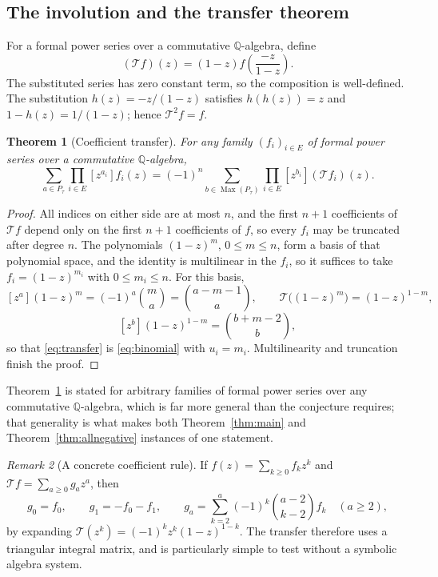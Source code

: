 \documentclass[11pt]{article}
\numberwithin{equation}{section}
\newtheorem{theorem}{Theorem}[section]
\theoremstyle{definition}
\theoremstyle{remark}
\newtheorem{remark}[theorem]{Remark}
\newcommand{\Q}{\mathbb Q}
\newcommand{\Max}{\operatorname{Max}}
\newcommand{\Tr}{\mathcal T}
\begin{document}
\subsection{The involution and the transfer theorem}

For a formal power series over a commutative $\Q$-algebra, define
\begin{equation}
 (\Tr f)(z)=(1-z)f\left(\frac{-z}{1-z}\right).
 \label{eq:T}
\end{equation}
The substituted series has zero constant term, so the composition is
well-defined. The substitution $h(z)=-z/(1-z)$ satisfies $h(h(z))=z$ and
$1-h(z)=1/(1-z)$; hence $\Tr^2f=f$.

\begin{theorem}[Coefficient transfer]
\label{thm:transfer}
For any family $(f_i)_{i\in E}$ of formal power series over a commutative
$\Q$-algebra,
\begin{equation}
 \boxed{\displaystyle
 \sum_{a\in P_\tau}\prod_{i\in E}[z^{a_i}]f_i(z)
 =(-1)^n\sum_{b\in \Max(P_\tau)}\prod_{i\in E}[z^{b_i}](\Tr f_i)(z).}
 \label{eq:transfer}
\end{equation}
\end{theorem}

\begin{proof}
All indices on either side are at most $n$, and the first $n+1$ coefficients
of $\Tr f$ depend only on the first $n+1$ coefficients of $f$, so every $f_i$
may be truncated after degree $n$. The polynomials $(1-z)^m$, $0\le m\le n$,
form a basis of that polynomial space, and the identity is multilinear in the
$f_i$, so it suffices to take $f_i=(1-z)^{m_i}$ with $0\le m_i\le n$. For this
basis,
\[
 [z^a](1-z)^m=(-1)^a\binom ma=\binom{a-m-1}{a},
 \qquad \Tr\bigl((1-z)^m\bigr)=(1-z)^{1-m},
\]
\[
 [z^b](1-z)^{1-m}=\binom{b+m-2}{b},
\]
so that \eqref{eq:transfer} is \eqref{eq:binomial} with $u_i=m_i$.
Multilinearity and truncation finish the proof.
\end{proof}

Theorem~\ref{thm:transfer} is stated for arbitrary families of formal power
series over any commutative $\Q$-algebra, which is far more general than the
conjecture requires; that generality is what makes both
Theorem~\ref{thm:main} and Theorem~\ref{thm:allnegative} instances of one
statement.

\begin{remark}[A concrete coefficient rule]
\label{rem:Tcoeff}
If $f(z)=\sum_{k\ge0}f_kz^k$ and $\Tr f=\sum_{a\ge0}g_az^a$, then
\begin{equation}
 g_0=f_0,\qquad g_1=-f_0-f_1,\qquad
 g_a=\sum_{k=2}^a(-1)^k\binom{a-2}{k-2}f_k\quad(a\ge2),
 \label{eq:Tcoeff}
\end{equation}
by expanding $\Tr(z^k)=(-1)^kz^k(1-z)^{1-k}$. The transfer therefore uses a
triangular integral matrix, and is particularly simple to test without a
symbolic algebra system.
\end{remark}
\end{document}
